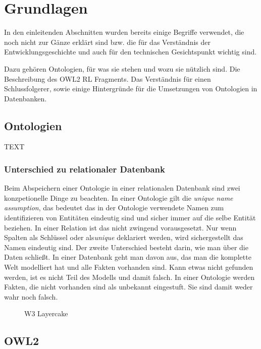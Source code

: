 \chapter{Grundlagen}
In den einleitenden Abschnitten wurden bereits einige Begriffe verwendet, die noch nicht zur Gänze erklärt sind bzw. die für das Verständnis der Entwicklungsgeschichte und auch für den technischen Gesichtspunkt wichtig sind.

Dazu gehören Ontologien, für was sie stehen und wozu sie nützlich sind. Die Beschreibung des OWL2 RL Fragments. Das Verständnis für einen Schlussfolgerer, sowie einige Hintergründe für die Umsetzungen von Ontologien in Datenbanken.

\section{Ontologien}


TEXT


\subsection{Unterschied zu relationaler Datenbank}

Beim Abspeichern einer Ontologie in einer relationalen Datenbank sind zwei konzpetionelle Dinge zu beachten. In einer Ontologie gilt die \emph{unique name assumption}, das bedeutet das in der Ontologie verwendete Namen zum identifizieren von Entitäten eindeutig sind und sicher immer auf die selbe Entität beziehen. In einer Relation ist das nicht zwingend vorausgesetzt. Nur wenn Spalten als Schlüssel oder als\emph{unique} deklariert werden, wird sichergestellt das Namen eindeutig sind.
Der zweite Unterschied besteht darin, wie man über die Daten schließt. In einer Datenbank geht man davon aus, das man die komplette Welt modelliert hat und alle Fakten vorhanden sind. Kann etwas nicht gefunden werden, ist es nicht Teil des Modells und damit falsch. In einer Ontologie werden Fakten, die nicht vorhanden sind als unbekannt eingestuft. Sie sind damit weder wahr noch falsch.
\begin{figure}
	\caption{W3 Layercake}
	\label{image-w3-layercake}
\end{figure}

\section{OWL2}
\label{abschnitt-owl2}

